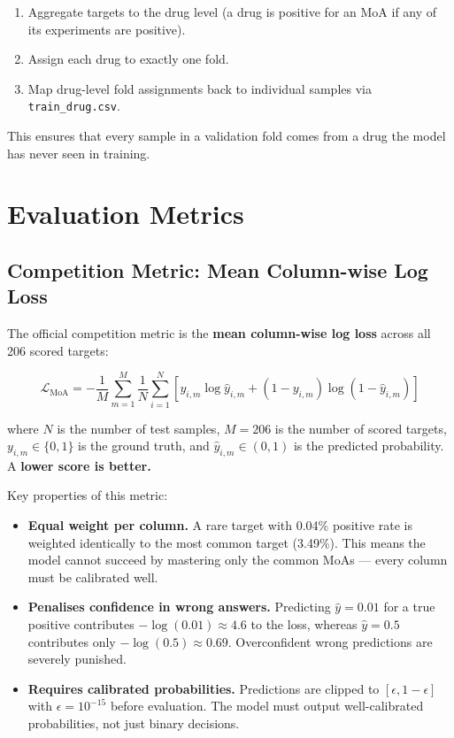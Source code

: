 \documentclass[12pt, a4paper]{article}
\begin{document}
\begin{enumerate}[noitemsep]
    \item Aggregate targets to the drug level (a drug is positive for an MoA if any of its experiments are positive).
    \item Assign each drug to exactly one fold.
    \item Map drug-level fold assignments back to individual samples via \texttt{train\_drug.csv}.
\end{enumerate}

This ensures that every sample in a validation fold comes from a drug the model has never seen in training.

\section{Evaluation Metrics}

\subsection{Competition Metric: Mean Column-wise Log Loss}

The official competition metric is the \textbf{mean column-wise log loss} across all 206 scored targets:

\begin{equation}
\mathcal{L}_{\text{MoA}} = -\frac{1}{M} \sum_{m=1}^{M} \frac{1}{N} \sum_{i=1}^{N} \left[ y_{i,m} \log \hat{y}_{i,m} + (1 - y_{i,m}) \log(1 - \hat{y}_{i,m}) \right]
\label{eq:moa_loss}
\end{equation}

where $N$ is the number of test samples, $M = 206$ is the number of scored targets, $y_{i,m} \in \{0, 1\}$ is the ground truth, and $\hat{y}_{i,m} \in (0, 1)$ is the predicted probability. A \textbf{lower score is better.}

Key properties of this metric:

\begin{itemize}
    \item \textbf{Equal weight per column.} A rare target with 0.04\% positive rate is weighted identically to the most common target (3.49\%). This means the model cannot succeed by mastering only the common MoAs — every column must be calibrated well.
    \item \textbf{Penalises confidence in wrong answers.} Predicting $\hat{y} = 0.01$ for a true positive contributes $-\log(0.01) \approx 4.6$ to the loss, whereas $\hat{y} = 0.5$ contributes only $-\log(0.5) \approx 0.69$. Overconfident wrong predictions are severely punished.
    \item \textbf{Requires calibrated probabilities.} Predictions are clipped to $[\epsilon, 1-\epsilon]$ with $\epsilon = 10^{-15}$ before evaluation. The model must output well-calibrated probabilities, not just binary decisions.
\end{itemize}
\end{document}
